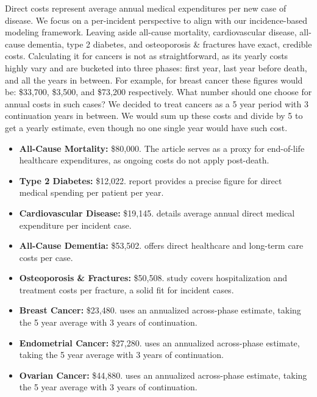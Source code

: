 \documentclass[12pt]{article}
\begin{document}
Direct costs represent average annual medical expenditures per new case of disease. We focus on a per-incident perspective to align with our incidence-based modeling framework. Leaving aside all-cause mortality, cardiovascular disease, all-cause dementia, type 2 diabetes, and osteoporosis \& fractures have exact, credible costs. Calculating it for cancers is not as straightforward, as its yearly costs highly vary and are bucketed into three phases: first year, last year before death, and all the years in between. For example, for breast cancer these figures would be: \$33,700, \$3,500, and \$73,200 respectively. What number should one choose for annual costs in such cases? We decided to treat cancers as a 5 year period with 3 continuation years in between. We would sum up these costs and divide by 5 to get a yearly estimate, even though no one single year would have such cost.

\begin{itemize}
\item \textbf{All-Cause Mortality:} \$80,000. The \cite{Arapakis2022} article serves as a proxy for end-of-life healthcare expenditures, as ongoing costs do not apply post-death.
\item \textbf{Type 2 Diabetes:} \$12,022. \cite{Parker2024} report provides a precise figure for direct medical spending per patient per year.
\item \textbf{Cardiovascular Disease:} \$19,145. \cite{Shah2024} details average annual direct medical expenditure per incident case.
\item \textbf{All-Cause Dementia:} \$53,502. \cite{Mehrotra2025} offers direct healthcare and long-term care costs per case.
\item \textbf{Osteoporosis \& Fractures:} \$50,508.\cite{Adeyemi2019} study covers hospitalization and treatment costs per fracture, a solid fit for incident cases.
\item \textbf{Breast Cancer:} \$23,480. \cite{Mariotto2020} uses an annualized across-phase estimate, taking the 5 year average with 3 years of continuation.
\item \textbf{Endometrial Cancer:} \$27,280.\cite{Mariotto2020} uses an annualized across-phase estimate, taking the 5 year average with 3 years of continuation.
\item \textbf{Ovarian Cancer:} \$44,880. \cite{Mariotto2020} uses an annualized across-phase estimate, taking the 5 year average with 3 years of continuation.
\end{itemize}
\end{document}
